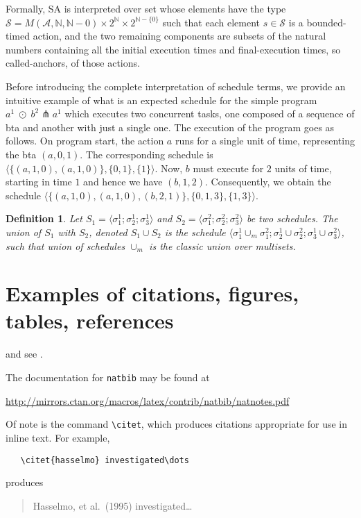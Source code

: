 \documentclass{article}
\newtheorem{definition}{Definition}
\begin{document}
Formally, {\sf SA} is interpreted over set whose elements have the type $\mathcal{S} = M(\mathcal{A},\mathbb{N},\mathbb{N}-{0}) \times 2^\mathbb{N} \times 2^{\mathbb{N}-\{0\}}$ such that each element $s \in \mathcal{S}$ is a bounded-timed action, and the two remaining components are subsets of the natural numbers containing all the initial execution times and final-execution times, so called-anchors, of those actions.

Before introducing the complete interpretation of schedule terms, we provide an intuitive example of what is an expected schedule for the simple program $a^1\;\odot\;b^2 \pitchfork a^1 $ which executes two concurrent tasks, one composed of a sequence of {\sc bta} and another with just a single one. The execution of the program goes as follows. On program start,  the action $a$ runs for a single unit of time, representing the {\sc bta} $(a,0,1)$. The  corresponding schedule is $\langle \{(a,1,0),(a,1,0)\}, \{0,1\} , \{1\} \rangle$. Now, $b$ must execute for $2$ units of time, starting in time $1$ and hence we have $(b,1,2)$. Consequently, we obtain the schedule $\langle \{(a,1,0),(a,1,0),(b,2,1)\}, \{0,1,3\} , \{1,3\} \rangle$.

\begin{definition}
	Let $S_1 = \langle \sigma_1^1 ; \sigma_2^1 ; \sigma_3^1 \rangle$ and $S_2 = \langle \sigma_1^2 ; \sigma_2^2 ; \sigma_3^2 \rangle$ be two schedules. The union of $S_1$ with $S_2$, denoted $S_1 \cup S_2$ is the schedule $\langle \sigma_1^1 \cup_m \sigma_1^2 ; \sigma_2^1 \cup \sigma_2^2 ; \sigma_3^1 \cup \sigma_3^2 \rangle$, such that union of schedules $\cup_m$ is the classic union over multisets.
\end{definition}





\section{Examples of citations, figures, tables, references}
\label{sec:others}
\lipsum[8] \cite{kour2014real,kour2014fast} and see \cite{hadash2018estimate}.

The documentation for \verb+natbib+ may be found at
\begin{center}
  \url{http://mirrors.ctan.org/macros/latex/contrib/natbib/natnotes.pdf}
\end{center}
Of note is the command \verb+\citet+, which produces citations
appropriate for use in inline text.  For example,
\begin{verbatim}
   \citet{hasselmo} investigated\dots
\end{verbatim}
produces
\begin{quote}
  Hasselmo, et al.\ (1995) investigated\dots
\end{quote}
\end{document}
